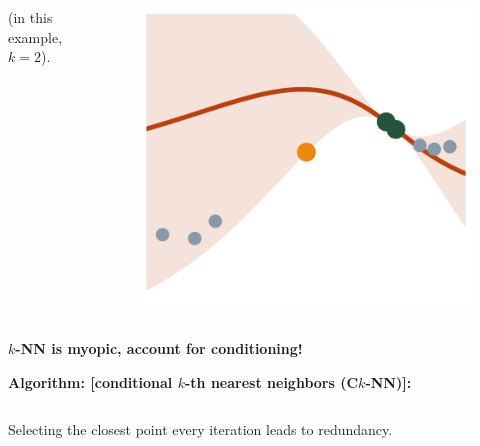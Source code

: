 \documentclass{beamer}                             %
\newcommand{\blocktitle}[1]{{\Large \textbf{#1}}}
\begin{document}
\begin{frame}[t]
\begin{columns}[T]
\begin{column}{0.30\textwidth}
\begin{tcolorbox}
\begin{columns}
\begin{column}{0.5\textwidth}
        (in this example, \( k = 2 \)).
      \end{column}
      \begin{column}{0.5\textwidth}
        \begin{figure}[h!]
          \centering
          \includegraphics[width=\textwidth]{graphs/predict_knn_2.png}
        \end{figure}
      \end{column}
    \end{columns}
  \end{tcolorbox}

  \begin{tcolorbox}
    \blocktitle{\( k \)-NN is myopic, account for conditioning!}

    \textbf{Algorithm: [conditional \( k\)-th
      nearest neighbors (C\( k \)-NN)]:}

    \begin{columns}
      \begin{column}{0.5\textwidth}
        Selecting the closest point every iteration leads to redundancy.


\end{column}
\end{columns}
\end{tcolorbox}
\end{column}
\end{columns}
\end{frame}
\end{document}
